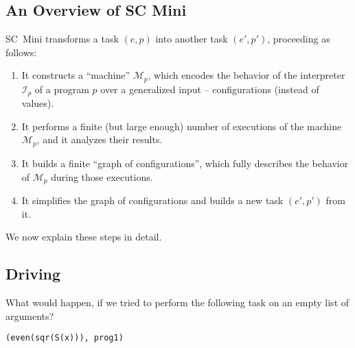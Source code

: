 \subsection{An Overview of SC Mini}



SC~Mini transforms a task $(e, p)$ into another task $(e', p')$, proceeding as follows:
\begin{enumerate}
  \item It constructs a ``machine'' $\mathcal{M}_p$, which encodes the behavior of the 
  interpreter $\mathcal{I}_p$ of a program $p$ over a generalized input 
  -- configurations (instead of values).
  \item It performs a finite (but large enough) number of executions of the machine
  $\mathcal{M}_p$, and it analyzes their results.
  \item It builds a finite ``graph of configurations'', which fully describes the behavior of
  $\mathcal{M}_p$ during those executions.
  \item It simplifies the graph of configurations and builds a new task $(e', p')$ from it.
\end{enumerate}

We now explain these steps in detail.

\subsection{Driving}
\label{sec:driving}
What would happen, if we tried to perform the following task on an empty list of arguments?
\begin{lstlisting}[language=sll]
(even(sqr(S(x))), prog1)
\end{lstlisting}

